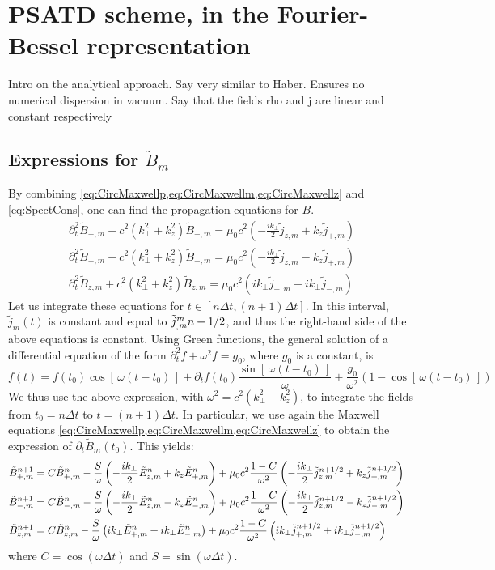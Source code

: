 \section{PSATD scheme, in the Fourier-Bessel
  representation}

Intro on the analytical approach. Say very similar to Haber. Ensures
no numerical dispersion in vacuum.
Say that the fields rho and j are linear and constant respectively

\subsection{Expressions for $\tilde{B}_m$}

By combining \cref{eq:CircMaxwellp,eq:CircMaxwellm,eq:CircMaxwellz}
and \cref{eq:SpectCons}, one can find the propagation equations for $B$.
\begin{align*}
\partial_t^2 \tilde{B}_{+,m} + c^2(k_\perp ^2+k_z^2) \tilde{B}_{+,m} = 
\mu_0 c^2 \left( - \frac{ik_\perp }{2} \tilde{j}_{z,m} + k_z \tilde{j}_{+,m}
\right) \\
\partial_t^2 \tilde{B}_{-,m} + c^2(k_\perp ^2+k_z^2) \tilde{B}_{-,m} = 
\mu_0 c^2 \left( - \frac{ik_\perp }{2} \tilde{j}_{z,m} - k_z \tilde{j}_{+,m}
\right) \\
\partial_t^2 \tilde{B}_{z,m} + c^2(k_\perp ^2+k_z^2) \tilde{B}_{z,m} =
\mu_0c^2  (ik_\perp  \tilde{j}_{+,m} + ik_\perp \tilde{j}_{-,m} ) 
\end{align*}
Let us integrate these equations for $t\in [n\Delta t, (n+1)\Delta
t]$. In this interval, $\tilde{j}_m(t)$ is constant
and equal to $\tilde{j}_{_,m}^{m}{n+1/2}$, and thus the right-hand side of the above
equations is constant. Using Green functions, the
general solution of a differential equation of the form 
$\partial_t^2 f + \omega^2 f = g_0$, where $g_0$ is a constant, is 
\[ f(t) = f(t_0) \cos[\,\omega (t-t_0)\,] + \partial_t f (t_0) \frac{
  \sin[\,\omega (t-t_0)\,]  }{\omega} + \frac{g_0}{\omega^2} (1-
\cos[\,\omega (t-t_0)\,] ) \]  
We thus use the above expression, with $\omega^2 =c^2(k_\perp^2 +
k_z^2)$, to integrate the fields from $t_0 = n\Delta t$ to $t=(n+1)\Delta t$. In
particular, we use again the Maxwell equations
\cref{eq:CircMaxwellp,eq:CircMaxwellm,eq:CircMaxwellz} to obtain the
expression of $\partial_t \tilde{B}_{m} (t_0)$. This yields:
\begin{align*}
\tilde{B}_{+,m}^{n+1} = \; & C \tilde{B}_{+,m}^{n} - 
\frac{S}{\omega}\left(-\frac{ik_\perp }{2} \tilde{E}_{z,m}^{n} + k_z\tilde{E}_{+,m}^{n}
\right) + \mu_0 c^2\frac{1-C}{\omega^2} \left( -\frac{ik_\perp }{2}
  \tilde{j}_{z,m}^{n+1/2} + k_z \tilde{j}_{+,m}^{n+1/2} \right)& \\
\tilde{B}_{-,m}^{n+1} =\; & C \tilde{B}_{-,m}^{n} - 
\frac{S}{\omega}\left(- \frac{ik_\perp }{2} \tilde{E}_{z,m}^{n} - k_z\tilde{E}_{-,m}^{n}
\right) + \mu_0 c^2\frac{1-C}{\omega^2} \left( - \frac{ik_\perp }{2}
  \tilde{j}_{z,m}^{n+1/2} - k_z \tilde{j}_{-,m}^{n+1/2} \right) &\\
\tilde{B}_{z,m}^{n+1} =\; & C \tilde{B}_{z,m}^{n} - 
\frac{S}{\omega}\left(ik_\perp \tilde{E}_{+,m}^{n} + ik_\perp \tilde{E}_{-,m}^{n}
\right) + \mu_0 c^2\frac{1-C}{\omega^2} \left( ik_\perp
  \tilde{j}_{+,m}^{n+1/2} + ik_\perp \tilde{j}_{-,m}^{n+1/2} \right)&
\end{align*}
where $C = \cos(\omega \Delta t)$ and $S = \sin(\omega \Delta t) $.

